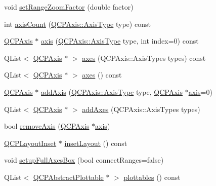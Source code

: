 \begin{DoxyCompactItemize}
\item 
void \hyperlink{class_q_c_p_axis_rect_ae83d187b03fc6fa4f00765ad50cd3fc3}{set\+Range\+Zoom\+Factor} (double factor)
\item 
int \hyperlink{class_q_c_p_axis_rect_a16e3e4646e52e4b5d5b865076c29ae58}{axis\+Count} (\hyperlink{class_q_c_p_axis_ae2bcc1728b382f10f064612b368bc18a}{Q\+C\+P\+Axis\+::\+Axis\+Type} type) const 
\item 
\hyperlink{class_q_c_p_axis}{Q\+C\+P\+Axis} $\ast$ \hyperlink{class_q_c_p_axis_rect_a560de44e47a4af0f86c59102a094b1e4}{axis} (\hyperlink{class_q_c_p_axis_ae2bcc1728b382f10f064612b368bc18a}{Q\+C\+P\+Axis\+::\+Axis\+Type} type, int index=0) const 
\item 
Q\+List$<$ \hyperlink{class_q_c_p_axis}{Q\+C\+P\+Axis} $\ast$ $>$ \hyperlink{class_q_c_p_axis_rect_a66654d51ca611ef036ded36250cd2518}{axes} (Q\+C\+P\+Axis\+::\+Axis\+Types types) const 
\item 
Q\+List$<$ \hyperlink{class_q_c_p_axis}{Q\+C\+P\+Axis} $\ast$ $>$ \hyperlink{class_q_c_p_axis_rect_a18dcdc0dd6c7520bc9f3d15a7a3feec2}{axes} () const 
\item 
\hyperlink{class_q_c_p_axis}{Q\+C\+P\+Axis} $\ast$ \hyperlink{class_q_c_p_axis_rect_a2dc336092ccc57d44a46194c8a23e4f4}{add\+Axis} (\hyperlink{class_q_c_p_axis_ae2bcc1728b382f10f064612b368bc18a}{Q\+C\+P\+Axis\+::\+Axis\+Type} type, \hyperlink{class_q_c_p_axis}{Q\+C\+P\+Axis} $\ast$\hyperlink{class_q_c_p_axis_rect_a560de44e47a4af0f86c59102a094b1e4}{axis}=0)
\item 
Q\+List$<$ \hyperlink{class_q_c_p_axis}{Q\+C\+P\+Axis} $\ast$ $>$ \hyperlink{class_q_c_p_axis_rect_a792e1f3d9cb1591fca135bb0de9b81fc}{add\+Axes} (Q\+C\+P\+Axis\+::\+Axis\+Types types)
\item 
bool \hyperlink{class_q_c_p_axis_rect_a03c39cd9704f0d36fb6cf980cdddcbaa}{remove\+Axis} (\hyperlink{class_q_c_p_axis}{Q\+C\+P\+Axis} $\ast$\hyperlink{class_q_c_p_axis_rect_a560de44e47a4af0f86c59102a094b1e4}{axis})
\item 
\hyperlink{class_q_c_p_layout_inset}{Q\+C\+P\+Layout\+Inset} $\ast$ \hyperlink{class_q_c_p_axis_rect_a4114887c7141b59650b7488f930993e5}{inset\+Layout} () const 
\item 
void \hyperlink{class_q_c_p_axis_rect_a5fa906175447b14206954f77fc7f1ef4}{setup\+Full\+Axes\+Box} (bool connect\+Ranges=false)
\item 
Q\+List$<$ \hyperlink{class_q_c_p_abstract_plottable}{Q\+C\+P\+Abstract\+Plottable} $\ast$ $>$ \hyperlink{class_q_c_p_axis_rect_a5b0d629c8de5572945eeae79a142296e}{plottables} () const 

\end{DoxyCompactItemize}
